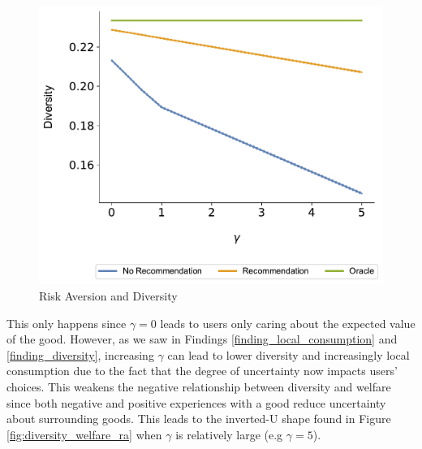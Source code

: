 \documentclass[sigconf]{acmart}
\begin{document}
\begin{figure}
\includegraphics[scale=0.1]{figures/gamma_diversity_N_200_T_20}
\caption{Risk Aversion and Diversity}
\label{fig:risk_aversion_diversity}
\end{figure}

This only happens since $\gamma = 0$ leads to users only caring about the expected value of the good. However, as we saw in Findings \ref{finding_local_consumption} and \ref{finding_diversity}, increasing $\gamma$ can lead to lower diversity and increasingly local consumption due to the fact that the degree of uncertainty now impacts users' choices. This weakens the negative relationship between diversity and welfare since both negative and positive experiences with a good reduce uncertainty about surrounding goods. This leads to the inverted-U shape found in Figure \ref{fig:diversity_welfare_ra} when $\gamma$ is relatively large (e.g $\gamma = 5$).
\end{document}

